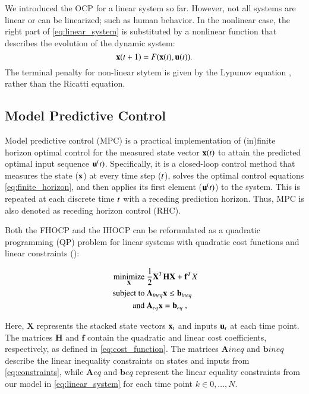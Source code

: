 We introduced the OCP for a linear system so far. However, not all systems are linear or can be linearized; such as human behavior. In the nonlinear case, the right part of \eqref{eq:linear_system} is substituted by a nonlinear function that describes the evolution of the dynamic system:
\begin{equation}
\label{eq:nonlinear_system}
    \mathbf{x}(t+1) = F(\mathbf{x}(t), \mathbf{u}(t)).
\end{equation}
The terminal penalty for non-linear stytem is given by the Lypunov equation \citep{Johansen2004}, rather than the Ricatti equation.

\subsection{Model Predictive Control}
\label{sec:back:mpc}
Model predictive control (MPC) is a practical implementation of (in)finite horizon optimal control for the measured state vector $\mathbf{x}(t)$ to attain the predicted optimal input sequence $\mathbf{u}^(t)$. Specifically, it is a closed-loop control method that measures the state ($\mathbf{x}$) at every time step ($t$), solves the optimal control equations \eqref{eq:finite_horizon}, and then applies its first element ($\mathbf{u}^(t)$) to the system. This is repeated at each discrete time $t$ with a receding prediction horizon. Thus, MPC is also denoted as receding horizon control (RHC). 

Both the FHOCP and the IHOCP can be reformulated as a quadratic programming (QP) problem for linear systems with quadratic cost functions and linear constraints (\citep{Gorges2017}):

\begin{align}
	\label{eq:quadratic_program}
	\underset{\mathbf{X}}{\text{minimize}} \ & \frac{1}{2} \mathbf{X}^{T} \mathbf{H} \mathbf{X} + \mathbf{f}^{T} X \\
	\text{ subject to } &\mathbf{A}_{\mathit{ineq}} \mathbf{x} \leq \mathbf{b}_{\mathit{ineq}} \nonumber \\
	\text{ and } & \mathbf{A}_{\mathit{eq}} \mathbf{x} = \mathbf{b}_{\mathit{eq}} \nonumber~,
\end{align}

Here, $\mathbf{X}$ represents the stacked state vectors $\mathbf{x}_{t}$ and inputs $\mathbf{u}_{t}$ at each time point. The matrices $\mathbf{H}$ and $\mathbf{f}$ contain the quadratic and linear cost coefficients, respectively, as defined in \eqref{eq:cost_function}. The matrices $\mathbf{A}{\mathit{ineq}}$ and $\mathbf{b}{\mathit{ineq}}$ describe the linear inequality constraints on states and inputs from \eqref{eq:constraints}, while $\mathbf{A}{\mathit{eq}}$ and $\mathbf{b}{\mathit{eq}}$ represent the linear equality constraints from our model in \eqref{eq:linear_system} for each time point $k \in {0,\ldots,N}$.


